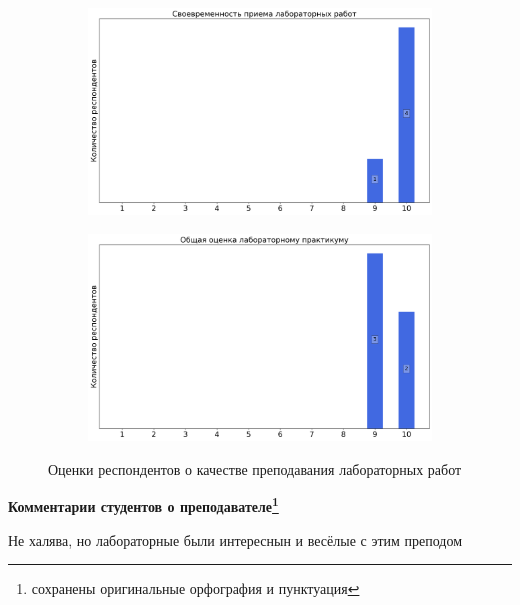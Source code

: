 \begin{figure}[H]
\begin{subfigure}[b]{0.45\textwidth}
                    \centering
                    \includegraphics[width=\textwidth]{images/3 course/Общая физика - квантовая физика/labniks-marks-Аникин Ю.А.-2.png}
                \end{subfigure}
                \begin{subfigure}[b]{0.45\textwidth}
                    \centering
                    \includegraphics[width=\textwidth]{images/3 course/Общая физика - квантовая физика/labniks-marks-Аникин Ю.А.-3.png}
                \end{subfigure}	
                \caption{Оценки респондентов о качестве преподавания лабораторных работ}
            \end{figure}

            \textbf{Комментарии студентов о преподавателе\protect\footnote{сохранены оригинальные орфография и пунктуация}}
                \begin{commentbox} 
                    Не халява, но лабораторные были интереснын и весёлые с этим преподом 
                \end{commentbox} 
            
